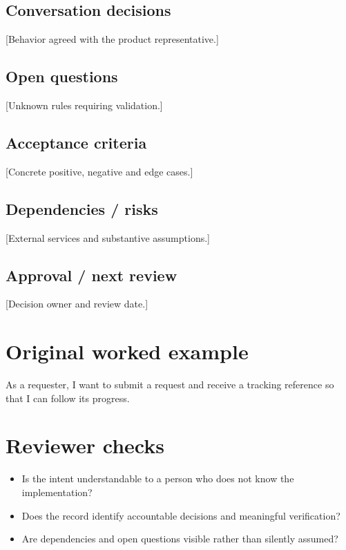\documentclass[11pt,letterpaper]{article}
\begin{document}
\subsection{Conversation decisions}
[Behavior agreed with the product representative.]

\subsection{Open questions}
[Unknown rules requiring validation.]

\subsection{Acceptance criteria}
[Concrete positive, negative and edge cases.]

\subsection{Dependencies / risks}
[External services and substantive assumptions.]

\subsection{Approval / next review}
[Decision owner and review date.]

\section{Original worked example}
\begin{tcolorbox}[colback=tealback,colframe=navy,title={Illustrative entry},breakable]
As a requester, I want to submit a request and receive a tracking reference so that I can follow its progress.

\end{tcolorbox}
\section{Reviewer checks}
\begin{itemize}[leftmargin=*,itemsep=2pt]
\item Is the intent understandable to a person who does not know the implementation?
\item Does the record identify accountable decisions and meaningful verification?
\item Are dependencies and open questions visible rather than silently assumed?
\end{itemize}
\end{document}
